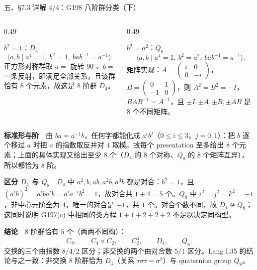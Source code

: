 \documentclass[aspectratio=169,10pt,fontset=none]{ctexbeamer}
\newcommand{\key}[1]{\textcolor{ink}{\bfseries #1}}
\begin{document}
\begin{frame}[t]{五、\S7.3 详解 4/4：G198 八阶群分类（下）}
\leavevmode{\footnotesize\key{详解 3：两个 presentation 各给出 $8$ 阶群}\par}
\begin{columns}[T,onlytextwidth]
\begin{column}{0.49\textwidth}
\begin{block}{\footnotesize $b^2=1$：$D_4$}
\scriptsize
\[ \langle a,b\mid a^4=1,\ b^2=1,\ bab^{-1}=a^{-1}\rangle. \]
正方形对称群取 $a=$ 旋转 $90^\circ$、$b=$ 一条反射，即满足全部关系，且该群恰有 $8$ 个元素，故这是 $8$ 阶群 $D_4$。
\end{block}
\end{column}
\begin{column}{0.49\textwidth}
\begin{block}{\footnotesize $b^2=a^2$：$Q_8$}
\scriptsize
\[ \langle a,b\mid a^4=1,\ b^2=a^2,\ bab^{-1}=a^{-1}\rangle. \]
矩阵实现：$A=\begin{pmatrix}i&0\\0&-i\end{pmatrix}$，$B=\begin{pmatrix}0&1\\-1&0\end{pmatrix}$，则 $A^2=B^2=-I$，$BAB^{-1}=A^{-1}$，且 $\pm I,\pm A,\pm B,\pm AB$ 是 $8$ 个不同矩阵。
\end{block}
\end{column}
\end{columns}
{\footnotesize\key{标准形与阶}\ \ 由 $ba=a^{-1}b$，任何字都能化成 $a^i b^j$（$0\le i\le3$，$j=0,1$）：把 $b$ 逐个移过 $a$ 时把 $a$ 的指数取反并对 $4$ 取模。故每个 presentation 至多给出 $8$ 个元素；上面的具体实现又给出至少 $8$ 个（$D_4$ 的 $8$ 个对称、$Q_8$ 的 $8$ 个矩阵互异），所以都恰为 $8$ 阶。\par}
{\footnotesize\key{区分 $D_4$ 与 $Q_8$}\ \ $D_4$ 中 $a^2,b,ab,a^2b,a^3b$ 都是对合：$b^2=1$，且 $(a^ib)^2=a^i b a^i b=a^i a^{-i} b^2=1$，故对合共 $1+4=5$ 个。$Q_8$ 中 $i^2=j^2=k^2=-1$，非中心元阶全为 $4$，唯一的对合是 $-1$，共 $1$ 个。对合个数不同，故 $D_4\ncong Q_8$；这同时说明 G197(c) 中相同的类方程 $1+1+2+2+2$ 不足以决定同构型。\par}
{\footnotesize\key{结论}\ \ $8$ 阶群恰有 $5$ 个（两两不同构）：
\[ C_8,\qquad C_4\times C_2,\qquad C_2^3,\qquad D_4,\qquad Q_8. \]
交换的三个由指数 $8/4/2$ 区分；非交换的两个由对合数 $5/1$ 区分。Lang I.35 的结论与之一致：非交换 $8$ 阶群恰为 $D_4$（关系 $\tau\sigma\tau=\sigma^3$）与 quaternion group $Q_8$。\par}
\end{frame}
\end{document}

